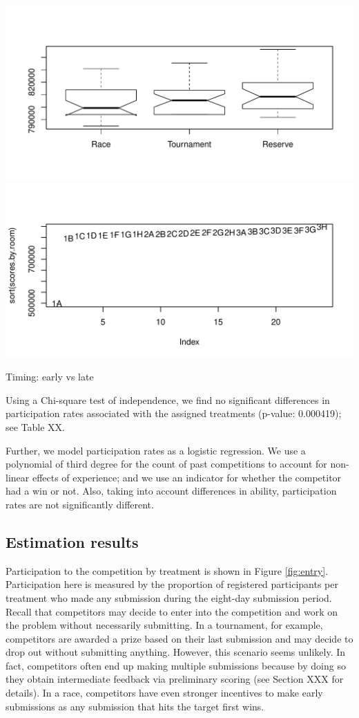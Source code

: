 \documentclass[12pt,]{article}
\begin{document}
\includegraphics{Figures/unnamed-chunk-12-1.pdf}
\includegraphics{Figures/unnamed-chunk-12-2.pdf}

Timing: early vs late

Using a Chi-square test of independence, we find no significant
differences in participation rates associated with the assigned
treatments (p-value: 0.000419); see Table XX.

Further, we model participation rates as a logistic regression. We use a
polynomial of third degree for the count of past competitions to account
for non-linear effects of experience; and we use an indicator for
whether the competitor had a win or not. Also, taking into account
differences in ability, participation rates are not significantly
different.

\subsection{Estimation results}\label{estimation-results}

Participation to the competition by treatment is shown in Figure
\ref{fig:entry}. Participation here is measured by the proportion of
registered participants per treatment who made any submission during the
eight-day submission period. Recall that competitors may decide to enter
into the competition and work on the problem without necessarily
submitting. In a tournament, for example, competitors are awarded a
prize based on their last submission and may decide to drop out without
submitting anything. However, this scenario seems unlikely. In fact,
competitors often end up making multiple submissions because by doing so
they obtain intermediate feedback via preliminary scoring (see Section
XXX for details). In a race, competitors have even stronger incentives
to make early submissions as any submission that hits the target first
wins.
\end{document}
